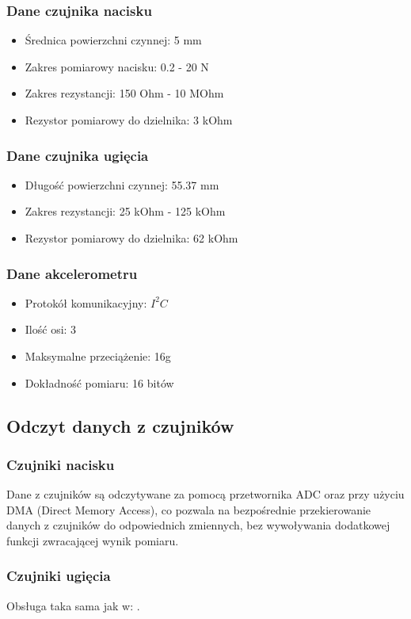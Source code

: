\documentclass[12pt,a4paper]{article}
\begin{document}
\subsubsection{Dane czujnika nacisku}
\begin{itemize}
\item Średnica powierzchni czynnej: 5 mm
\item Zakres pomiarowy nacisku: 0.2 - 20 N
\item Zakres rezystancji: 150 Ohm - 10 MOhm
\item Rezystor pomiarowy do dzielnika: 3 kOhm
\end{itemize}
\subsubsection{Dane czujnika ugięcia}
\begin{itemize}
\item Długość powierzchni czynnej: 55.37 mm
\item Zakres rezystancji: 25 kOhm - 125 kOhm
\item Rezystor pomiarowy do dzielnika: 62 kOhm
\end{itemize}
\subsubsection{Dane akcelerometru}
\begin{itemize}
\item Protokół komunikacyjny: $I^2C$
\item Ilość osi: 3
\item Maksymalne przeciążenie: 16g
\item Dokładność pomiaru: 16 bitów 
\end{itemize}
\subsection{Odczyt danych z czujników}
\subsubsection{Czujniki nacisku} \label{czujniki_nacisku}
Dane z czujników są odczytywane za pomocą przetwornika ADC oraz przy użyciu DMA (Direct Memory Access), co pozwala na bezpośrednie przekierowanie danych z czujników do odpowiednich zmiennych, bez wywoływania dodatkowej funkcji zwracającej wynik pomiaru.
\subsubsection{Czujniki ugięcia}
Obsługa taka sama jak w: .
\end{document}
